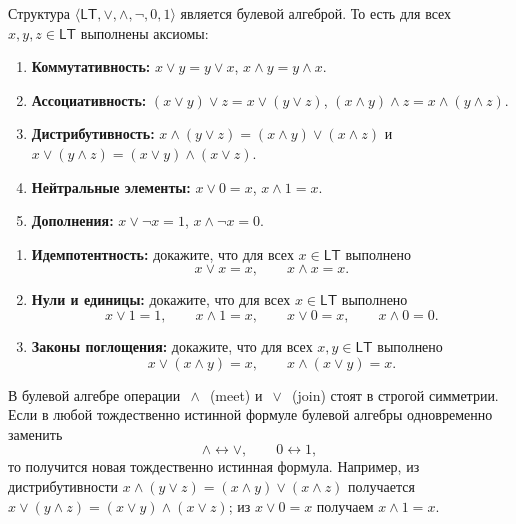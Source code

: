\documentclass[11pt, a4paper]{extarticle}
\begin{document}
\begin{theorem}
Структура $\langle \mathsf{LT}, \vee, \wedge, \neg, 0, 1 \rangle$ является булевой алгеброй. То есть для всех $x,y,z \in \mathsf{LT}$ выполнены аксиомы:
\begin{enumerate}[label=(\alph*), nosep]
    \item \textbf{Коммутативность:} $x\vee y = y\vee x$, $x\wedge y = y\wedge x$.
    \item \textbf{Ассоциативность:} $(x\vee y)\vee z = x\vee(y\vee z)$, $(x\wedge y)\wedge z = x\wedge(y\wedge z)$.
    \item \textbf{Дистрибутивность:} $x\wedge(y\vee z) = (x\wedge y)\vee(x\wedge z)$ и $x\vee(y\wedge z) = (x\vee y)\wedge(x\vee z)$.
    \item \textbf{Нейтральные элементы:} $x\vee 0 = x$, $x\wedge 1 = x$.
    \item \textbf{Дополнения:} $x\vee \neg x = 1$, $x\wedge \neg x = 0$.
\end{enumerate}
\end{theorem}

\begin{exercise}
\begin{enumerate}
    \item \textbf{Идемпотентность:} докажите, что для всех $x \in \mathsf{LT}$ выполнено
    $$x \vee x = x, \qquad x \wedge x = x.$$
    
    \item \textbf{Нули и единицы:} докажите, что для всех $x \in \mathsf{LT}$ выполнено
    $$x \vee 1 = 1,\qquad x \wedge 1 = x,\qquad x \vee 0 = x,\qquad x \wedge 0 = 0.$$
    
    \item \textbf{Законы поглощения:} докажите, что для всех $x,y \in \mathsf{LT}$ выполнено
    $$x \vee (x \wedge y) = x,\qquad x \wedge (x \vee y) = x.$$
\end{enumerate}
\end{exercise}

\begin{remark}
В булевой алгебре операции $\,\wedge\,$ (meet) и $\,\vee\,$ (join) стоят в строгой симметрии.
Если в любой тождественно истинной формуле булевой алгебры одновременно заменить
$$
\wedge \leftrightarrow \vee,\qquad 0 \leftrightarrow 1,
$$
то получится новая тождественно истинная формула.
Например, из дистрибутивности $x\wedge(y\vee z)=(x\wedge y)\vee(x\wedge z)$ получается
$x\vee(y\wedge z)=(x\vee y)\wedge(x\vee z)$; из $x\vee 0=x$ получаем $x\wedge 1=x$.
\end{remark}
\end{document}
